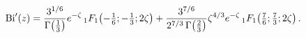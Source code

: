 \[\mathop{\mathrm{Bi}\/}\nolimits'\!\left(z\right)=\frac{3^{1/6}}{\mathop{\Gamma%
\/}\nolimits\!\left(\tfrac{1}{3}\right)}e^{-\zeta}\mathop{{{}_{1}F_{1}}\/}%
\nolimits\!\left(-\tfrac{1}{6};-\tfrac{1}{3};2\zeta\right)+\frac{3^{7/6}}{2^{7%
/3}\mathop{\Gamma\/}\nolimits\!\left(\tfrac{2}{3}\right)}\zeta^{4/3}e^{-\zeta}%
\mathop{{{}_{1}F_{1}}\/}\nolimits\!\left(\tfrac{7}{6};\tfrac{7}{3};2\zeta%
\right).\]
